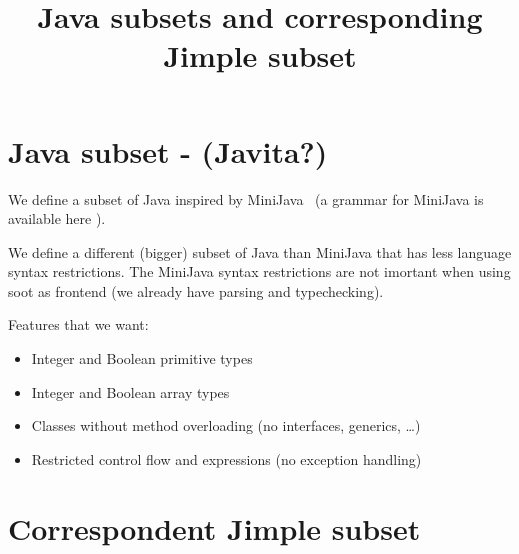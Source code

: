 \documentclass{report}
\newcommand{\minijava}{MiniJava\xspace}
\begin{document}
\title{Java subsets and corresponding Jimple subset}

\maketitle



\section{Java subset - (Javita?)}
We define a subset of Java inspired by \minijava~\cite{} (a grammar
for \minijava is available here \label{sec:minijava}).

We define a different (bigger) subset of Java than \minijava that has
less language syntax restrictions.
%
The \minijava syntax restrictions are not imortant when using soot as
frontend (we already have parsing and typechecking).

Features that we want:
\begin{itemize}
\item Integer and Boolean primitive types
\item Integer and Boolean array types
\item Classes without method overloading (no interfaces, generics, \ldots)
\item Restricted control flow and expressions (no exception handling)
\end{itemize}

\section{Correspondent Jimple subset}
\begin{grammar}
  
\end{grammar}
\end{document}
